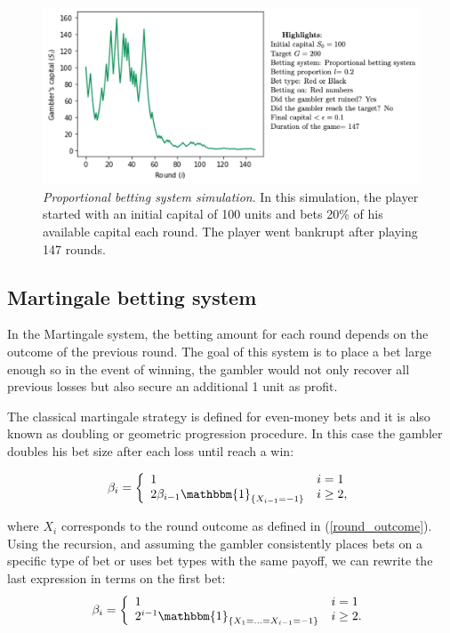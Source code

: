 \documentclass[11pt,twoside]{article}
\numberwithin{Theorem}{section}
\numberwithin{Definition}{section}
\numberwithin{Lemma}{section}
\numberwithin{Algorithm}{section}
\numberwithin{equation}{section}
\def\1{\mathbbm{1}}
\begin{document}
\begin{figure}[H]
        \centering
        \includegraphics[width=13 cm]{pro_ex_1.png}
        \caption[Proportional betting system simulation]{\textit{Proportional betting system simulation}. In this simulation, the player started with an initial capital of 100 units and bets 20\% of his available capital each round. The player went bankrupt after playing 147 rounds.}\label{sim_02}
\end{figure}
\subsection{Martingale betting system}
In the Martingale system, the betting amount for each round depends on the outcome of the previous round. The goal of this system is to place a bet large enough so in the event of winning, the gambler would not only recover all previous losses but also secure an additional 1 unit as profit. 

The classical martingale strategy is defined for even-money bets and it is also known as doubling or geometric progression procedure. In this case the gambler doubles his bet size after each loss until reach a win:

\begin{equation*}
\beta_{i} = \left\{
\begin{array}{ll}
1 &  i = 1\\
2\beta_{i-1}\1_{\{X_{i-1} = -1\}} &  i\geq 2,
\end{array}
\right.
\end{equation*}

where $X_{i}$ corresponds to the round outcome as defined in (\ref{round_outcome}). Using the recursion, and assuming the gambler consistently places bets on a specific type of bet or uses bet types with the same payoff,  we can rewrite the last expression in terms on the first bet:
\begin{equation}
\beta_{i} = \left\{
\begin{array}{ll}
1 &  i = 1\\
2^{i-1}\1_{\{X_{1} =...=X_{i-1} = -1\}} & i\geq 2.
\end{array}
\right.
\end{equation}
\end{document}
